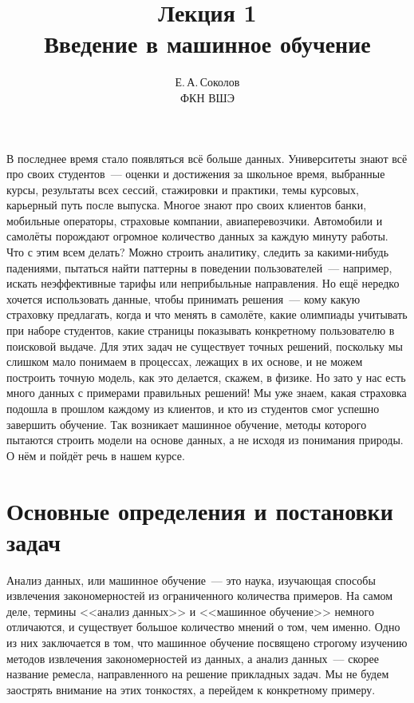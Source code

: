 \documentclass[12pt,fleqn]{article}
\begin{document}
\title{Лекция 1\\Введение в машинное обучение}
\author{Е.\,А.\,Соколов\\ФКН ВШЭ}
\maketitle

В последнее время стало появляться всё больше данных.
Университеты знают всё про своих студентов~--- оценки и достижения за школьное время,
выбранные курсы, результаты всех сессий, стажировки и практики, темы курсовых,
карьерный путь после выпуска.
Многое знают про своих клиентов банки, мобильные операторы, страховые компании, авиаперевозчики.
Автомобили и самолёты порождают огромное количество данных за каждую минуту работы.
Что с этим всем делать?
Можно строить аналитику, следить за какими-нибудь падениями, пытаться найти паттерны в поведении
пользователей~--- например, искать неэффективные тарифы или неприбыльные направления.
Но ещё нередко хочется использовать данные, чтобы принимать решения~--- кому какую страховку предлагать,
когда и что менять в самолёте, какие олимпиады учитывать при наборе студентов,
какие страницы показывать конкретному пользователю в поисковой выдаче.
Для этих задач не существует точных решений, поскольку мы слишком мало понимаем в процессах,
лежащих в их основе, и не можем построить точную модель, как это делается, скажем, в физике.
Но зато у нас есть много данных с примерами правильных решений!
Мы уже знаем, какая страховка подошла в прошлом каждому из клиентов,
и кто из студентов смог успешно завершить обучение.
Так возникает машинное обучение, методы которого пытаются строить модели
на основе данных, а не исходя из понимания природы.
О нём и пойдёт речь в нашем курсе.

\section{Основные определения и постановки задач}
Анализ данных, или машинное обучение~--- это наука, изучающая способы извлечения закономерностей
из ограниченного количества примеров.
На самом деле, термины <<анализ данных>> и <<машинное обучение>> немного отличаются, и существует большое
количество мнений о том, чем именно.
Одно из них заключается в том, что машинное обучение посвящено строгому
изучению методов извлечения закономерностей из данных,
а анализ данных~--- скорее название ремесла, направленного на решение прикладных задач.
Мы не будем заострять внимание на этих тонкостях, а перейдем к конкретному примеру.
\end{document}
